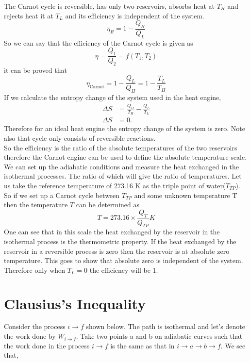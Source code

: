 \documentclass[12pt]{article}
\begin{document}
The Carnot cycle is reversible, has only two reservoirs, absorbs heat at $T_H$ and rejects heat it at $T_L$ and its efficiency is independent of the system.
\begin{equation}
	\eta_R=1-\frac{Q_H}{Q_L}
\end{equation}
So we can say that the efficiency of the Carnot cycle is given as 
$$\eta=\frac{Q_1}{Q_2}=f(T_1,T_2)$$
it can be proved that 
\begin{equation}
	\eta_{\text{Carnot}}=1-\dfrac{Q_L}{Q_H}=1-\dfrac{T_L}{T_H}
\end{equation}
If we calculate the entropy change of the system used in the heat engine,
\begin{align*}
	\Delta S&=\frac{Q_H}{T_H}-\frac{Q_L}{T_L}\\
	\Delta S&=0.
\end{align*}
Therefore for an ideal heat engine the entropy change of the system is zero. Note also that cycle only consists of reversible reactions. 
\\

So the efficiency is the ratio of the absolute temperatures of the two reservoirs therefore the Carnot engine can be used to define the absolute temperature scale. We can set up the adiabatic conditions and measure the heat exchanged in the isothermal processes. The ratio of which will give the ratio of temperatures. Let us take the reference temperature of 273.16 K as the triple point of water($T_{TP}$). So if we set up a Carnot cycle between $T_{TP}$ and some unknown temperature T then the temperature $T$ can be determined as
\begin{equation}
	T=273.16\times \frac{Q_T}{Q_{TP}}K
\end{equation}
One can see that in this scale the heat exchanged by the reservoir in the isothermal process is the thermometric property. If the heat exchanged by the reservoir in a reversible process is zero then the reservoir is at absolute zero temperature. This goes to show that absolute zero is independent of the system. Therefore only when $T_L=0$ the efficiency will be 1. 

\section{Clausius's Inequality}
Consider the process $i \to f$ shown below. The path is isothermal and let's denote the work done by $W_{i\to f}$. Take two points a and b on adiabatic curves such that the work done in the process $i\to f$ is the same as that in $i\to a\to b\to f$. We see that,
\end{document}
